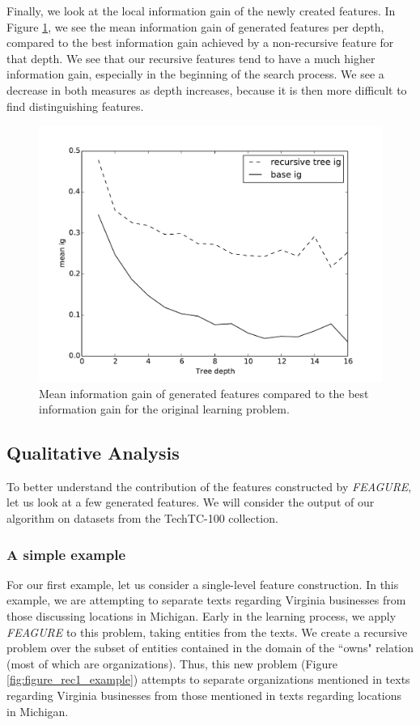 \documentclass[twoside,11pt]{article}
\theoremstyle{definition}
\begin{document}
Finally, we look at the local information gain of the newly created features. In Figure \ref{fig:local_ig_depth}, we see the mean information gain of generated features per depth, compared to the best information gain achieved by a non-recursive feature for that depth. We see that our recursive features tend to have a much higher information gain, especially in the beginning of the search process. We see a decrease in both measures as depth increases, because it is then more difficult to find distinguishing features.

\begin{figure}[h!]
	\centering
	\includegraphics[scale=0.4]{local_ig_depth}
	\caption{Mean information gain of generated features compared to the best information gain for the original learning problem.}
	\label{fig:local_ig_depth}
\end{figure}

\subsection{Qualitative Analysis}

To better understand the contribution of the features constructed by \emph{FEAGURE}, let us look at a few generated features. We will consider the output of our algorithm on datasets from the TechTC-100 collection.

\subsubsection{A simple example}

For our first example, let us consider a single-level feature construction.
In this example, we are attempting to separate texts regarding Virginia businesses from those discussing locations in Michigan. Early in the learning process, we apply \emph{FEAGURE} to this problem, taking entities from the texts. We create a recursive problem over the subset of entities contained in the domain of the ``owns" relation (most of which are organizations). Thus, this new problem (Figure \ref{fig:figure_rec1_example}) attempts to separate organizations mentioned in texts regarding Virginia businesses from those mentioned in texts regarding locations in Michigan.
\end{document}
